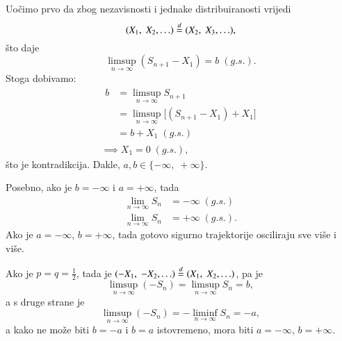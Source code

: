 \begin{pr}
    Uo\v cimo prvo da zbog nezavisnosti i jednake distribuiranosti vrijedi
    \begin{equation*}
        (X_1, \; X_2, \ldots) \overset{d}{=} (X_2, \; X_3, \ldots),
    \end{equation*}
    \v sto daje 
    \begin{equation*}
        \limsup\limits_{n \to \infty} (S_{n + 1} - X_1) = b \; (g.s.).
    \end{equation*}
    Stoga dobivamo:
    \begin{equation*}
        \begin{gathered}
            \begin{aligned}
                b &= \limsup\limits_{n \to \infty} S_{n + 1}\\
                &= \limsup\limits_{n \to \infty} \big[ (S_{n + 1} - X_1) + X_1 \big]\\
                &= b + X_1 \; (g.s.)
            \end{aligned}\\
            \implies X_1 = 0 \; (g.s.),
        \end{gathered}
    \end{equation*}
    \v sto je kontradikcija.
    Dakle, $a, b \in \{-\infty, \; +\infty\}$.

    Posebno, ako je $b = -\infty$ i $a = + \infty$, tada
    \begin{equation*}
        \begin{aligned}
            \lim\limits_{n  \to \infty} S_n &= -\infty \; (g.s.)\\
            \lim\limits_{n \to \infty} S_n &= +\infty \; (g.s.).
        \end{aligned}
    \end{equation*}
    Ako je $a = -\infty$, $b = +\infty$, tada gotovo sigurno trajektorije osciliraju sve vi\v se i vi\v se.

    Ako je $p = q = \frac{1}{2}$, tada je $(-X_1, \; -X_2, \ldots) \overset{d}{=} (X_1, \; X_2, \ldots)$, pa je
    \begin{equation*}
        \limsup\limits_{n \to \infty} (-S_n) = \limsup\limits_{n \to \infty} S_n = b,
    \end{equation*}
    a s druge strane je
    \begin{equation*}
        \limsup\limits_{n \to \infty} (-S_n) = - \liminf\limits_{n \to \infty} S_n = -a,
    \end{equation*}
    a kako ne mo\v ze biti $b = -a$ i $b = a$ istovremeno, mora biti $a = -\infty$, $b = +\infty$.


\end{pr}

